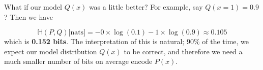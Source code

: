 \documentclass[]{article}
\begin{document}
What if our model $Q(x)$ was a little better? For example, say $Q(x=1) = 0.9$? Then we have

\begin{equation}
    \mathbb{H}(P, Q) \text{[nats]} = -0 \times \log(0.1) - 1 \times \log(0.9) \approx 0.105
\end{equation}
which is \textbf{0.152 bits}. The interpretation of this is natural; $90\%$ of the time, we expect our model distribution $Q(x)$ to be correct, and therefore we need a much smaller number of bits on average encode $P(x)$.
\end{document}
